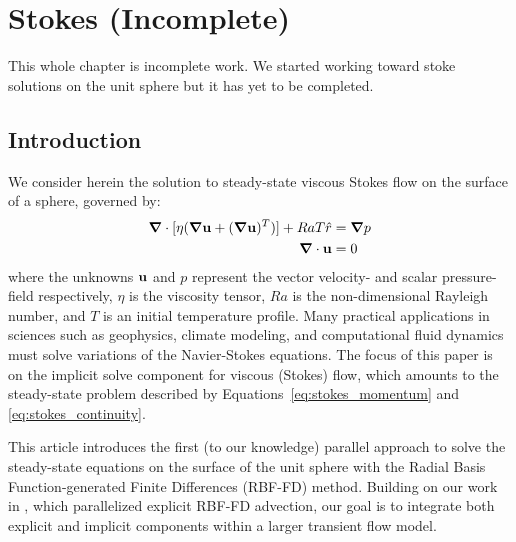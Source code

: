 
\chapter{Stokes (Incomplete)}

This whole chapter is incomplete work. We started working toward stoke solutions on the unit sphere but it has yet to be completed. 

\section{Introduction}

We consider herein the solution to steady-state viscous Stokes flow on the surface of a sphere, governed by: 
  \begin{align}
\mbox{\boldmath$ \nabla $} \cdot [\eta(\mbox{\boldmath$ \nabla $} \mathbf{u} + (\mbox{\boldmath$ \nabla $} \mathbf{u})^T)] + Ra T \hat{r} & = \mbox{\boldmath$ \nabla $} p \label{eq:stokes_momentum} \\
\mbox{\boldmath$ \nabla $} \cdot \mathbf{u} & = 0 \label{eq:stokes_continuity} 
\end{align}
where the unknowns $\mathbf{u}$ and $p$ represent the vector velocity- and scalar pressure-field respectively, $\eta$ is the viscosity tensor, $Ra$ is the non-dimensional Rayleigh number, and $T$ is an initial temperature profile. Many practical applications in sciences such as geophysics, climate modeling, and computational fluid dynamics must solve variations of the Navier-Stokes equations. The focus of this paper is on the implicit solve component for viscous (Stokes) flow, which amounts to the steady-state problem described by Equations~\ref{eq:stokes_momentum} and \ref{eq:stokes_continuity}. 



This article introduces the first (to our knowledge) parallel approach to solve the steady-state equations on the surface of the unit sphere with the Radial Basis Function-generated Finite Differences (RBF-FD) method. Building on our work in \cite{bolligFlyerErlebacher2011}, which parallelized explicit RBF-FD advection, our goal is to integrate both explicit and implicit components within a larger transient flow model. 


